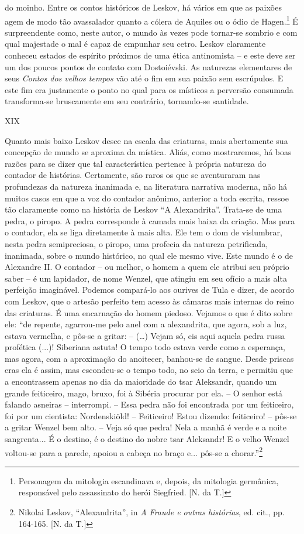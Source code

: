 do moinho. Entre os contos históricos de Leskov, há vários em que as
paixões agem de modo tão avassalador quanto a cólera de Aquiles ou o
ódio de Hagen.\footnote{Personagem da mitologia escandinava e, depois,
  da mitologia germânica, responsável pelo assassinato do herói
  Siegfried. {[}N. da T.{]}} É surpreendente como, neste autor, o mundo
às vezes pode tornar-se sombrio e com qual majestade o mal é capaz de
empunhar seu cetro. Leskov claramente conheceu estados de espírito
próximos de uma ética antinomista -- e este deve ser um dos poucos
pontos de contato com Dostoiévski. As naturezas elementares de seus
\emph{Contos dos velhos tempos} vão até o fim em sua paixão sem
escrúpulos. E este fim era justamente o ponto no qual para os místicos a
perversão consumada transforma-se bruscamente em seu contrário,
tornando-se santidade.

XIX

Quanto mais baixo Leskov desce na escala das criaturas, mais abertamente
sua concepção de mundo se aproxima da mística. Aliás, como mostraremos,
há boas razões para se dizer que tal característica pertence à própria
natureza do contador de histórias. Certamente, são raros os que se
aventuraram nas profundezas da natureza inanimada e, na literatura
narrativa moderna, não há muitos casos em que a voz do contador anônimo,
anterior a toda escrita, ressoe tão claramente como na história de
Leskov ``A Alexandrita''. Trata-se de uma pedra, o piropo. A pedra
corresponde à camada mais baixa da criação. Mas para o contador, ela se
liga diretamente à mais alta. Ele tem o dom de vislumbrar, nesta pedra
semipreciosa, o piropo, uma profecia da natureza petrificada, inanimada,
sobre o mundo histórico, no qual ele mesmo vive. Este mundo é o de
Alexandre II. O contador -- ou melhor, o homem a quem ele atribui seu
próprio saber -- é um lapidador, de nome Wenzel, que atingiu em seu
ofício a mais alta perfeição imaginável. Podemos compará-lo aos ourives
de Tula e dizer, de acordo com Leskov, que o artesão perfeito tem acesso
às câmaras mais internas do reino das criaturas. É uma encarnação do
homem piedoso. Vejamos o que é dito sobre ele: ``de repente, agarrou-me
pelo anel com a alexandrita, que agora, sob a luz, estava vermelha, e
pôs-se a gritar: -- (\ldots{}) Vejam só, eis aqui aquela pedra russa
profética (...)! Siberiana astuta! O tempo todo estava verde como a
esperança, mas agora, com a aproximação do anoitecer, banhou-se de
sangue. Desde priscas eras ela é assim, mas escondeu-se o tempo todo, no
seio da terra, e permitiu que a encontrassem apenas no dia da maioridade
do tsar Aleksandr, quando um grande feiticeiro, mago, bruxo, foi à
Sibéria procurar por ela. -- O senhor está falando asneiras --
interrompi. -- Essa pedra não foi encontrada por um feiticeiro, foi por
um cientista: Nordenskiöld! -- Feiticeiro! Estou dizendo: feiticeiro! --
pôs-se a gritar Wenzel bem alto. -- Veja só que pedra! Nela a manhã é
verde e a noite sangrenta... É o destino, é o destino do nobre tsar
Aleksandr! E o velho Wenzel voltou-se para a parede, apoiou a cabeça no
braço e... pôs-se a chorar.''\footnote{Nikolai Leskov, ``Alexandrita'',
  in \emph{A Fraude e outras histórias}, ed. cit., pp. 164-165. {[}N. da
  T.{]}}

